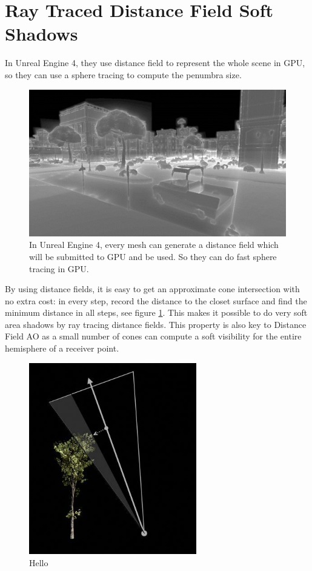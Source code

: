 \section{Ray Traced Distance Field Soft Shadows}
In Unreal Engine 4, they use distance field to represent the whole scene in GPU, so they can use a sphere tracing to compute the penumbra size.

\begin{figure}
	\includegraphics[width=1.0\textwidth]{graphics/shadows/VisualizeMeshDistanceFields}
	\caption{In Unreal Engine 4, every mesh can generate a distance field which will be submitted to GPU and be used. So they can do fast sphere tracing in GPU.}
\end{figure}

By using distance fields, it is easy to get an approximate cone intersection with no extra cost: in every step, record the distance to the closet surface and find the minimum distance in all steps, see figure \ref{f:ConeTrace}. This makes it possible to do very soft area shadows by ray tracing distance fields. This property is also key to Distance Field AO as a small number of cones can compute a soft visibility for the entire hemisphere of a receiver point.

\begin{figure}
\sidecaption
	\includegraphics[width=0.65\textwidth]{graphics/shadows/ConeTrace}
	\caption{Hello}
	\label{f:ConeTrace}
\end{figure}


